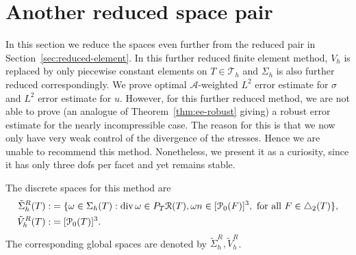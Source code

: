 \documentclass[12pt]{amsart}
\numberwithin{equation}{section}
\theoremstyle{definition}
\theoremstyle{remark}
\renewcommand{\(}{\bigl(}
\renewcommand{\)}{\bigr)}
\newcommand{\dive}{{\ensuremath\mathop{\mathrm{div}\,}}} %
\newcommand{\pol}{\EuScript{P}}
\newcommand{\RM}{\mathcal{R}}
\begin{document}


\appendix


\section{Another reduced space pair}
\label{sec:2nd-reduced-element}

In this section we reduce the spaces even further from the reduced pair in Section~\ref{sec:reduced-element}. In this further reduced finite element method, $V_h$ is replaced by only piecewise constant elements on $T \in \mathcal{T}_h$ and $\Sigma_h$ is also further reduced correspondingly. 
We prove optimal $\mathcal{A}$-weighted $L^2$ error estimate for
$\sigma$ and $L^2$ error estimate for $u$. However, for this further
reduced method, we are not able to prove
(an analogue of Theorem~\ref{thm:ee-robust} giving)
a robust error estimate 
for the nearly incompressible case. The reason for this is that we now only
have very weak
control of the divergence of the stresses.  Hence we are unable to
recommend this method. Nonetheless, we present it as a curiosity,
since it has only three dofs per facet and yet remains stable. %


The discrete spaces for this method are 
\begin{alignat*}{1}
\tilde{\Sigma}_h^R(T):& =  \{ \omega \in \Sigma_h(T): \dive \omega \in P_T \RM(T),  \omega n \in [\pol_0(F)]^3, {\text{ for all }} F \in \triangle_2(T)\},\\
\tilde{V}_h^R(T):& =  [\pol_0(T)]^3.
\end{alignat*}
The corresponding global spaces are denoted by  $\tilde{\Sigma}_h^R, \tilde{V}_h^R$. 
\end{document}
